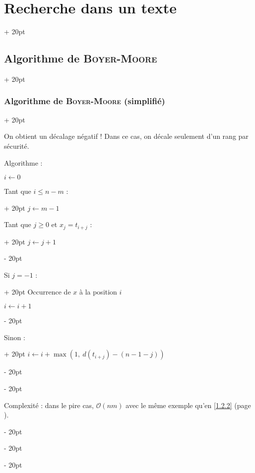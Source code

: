 \documentclass[a4paper, 12pt, twoside]{article}
\renewcommand{\le}{\leqslant}
\renewcommand{\ge}{\geqslant}
\newcommand{\ind}[1][20pt]{\advance\leftskip + #1}
\newcommand{\deind}[1][20pt]{\advance\leftskip - #1}
\newenvironment{indt}[2][20pt]{#2 \par \ind[#1]}{\par \deind} %
\begin{document}
\begin{indt}{\section{Recherche dans un texte}}
\begin{indt}{\subsection{Algorithme de \textsc{Boyer-Moore}}}
\begin{indt}{\subsubsection{Algorithme de \textsc{Boyer-Moore} (simplifié)}}
\begin{center}
                \end{center}

                On obtient un décalage négatif !
                Dans ce cas, on décale seulement d'un rang par sécurité.


                Algorithme :

                \begin{pseudocode}
                    $i \leftarrow 0$ 

                    \begin{indt}{Tant que $i \le n - m$ :}
                        $j \leftarrow m - 1$
                        
                        \vspace{6pt}

                        \begin{indt}{Tant que $j \ge 0$ et $x_j = t_{i + j}$ :}
                            $j \leftarrow j + 1$
                        \end{indt}
                        
                        \vspace{6pt}

                        \begin{indt}{Si $j = -1$ :}
                            Occurrence de $x$ à la position $i$
                            
                            $i \leftarrow i + 1$
                        \end{indt}
                        
                        \vspace{6pt}

                        \begin{indt}{Sinon : }
                            $i \leftarrow i + \max(1,\ d(t_{i+j}) - (n - 1 - j))$
                        \end{indt}
                    \end{indt}
                \end{pseudocode}

                Complexité : dans le pire cas, $\mathcal O(nm)$ avec le même exemple qu'en \ref{1.2.2} (page \pageref{1.2.2}).
            \end{indt}


\end{indt}
\end{indt}
\end{document}
